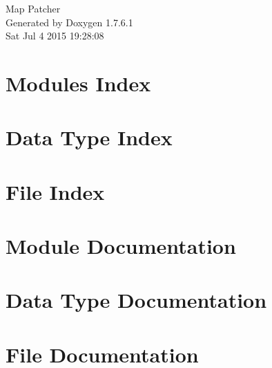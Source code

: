 \documentclass[a4paper]{book}
\begin{document}
\hypersetup{pageanchor=false,citecolor=blue}
\begin{titlepage}
\vspace*{7cm}
\begin{center}
{\Large \-Map \-Patcher }\\
\vspace*{1cm}
{\large \-Generated by Doxygen 1.7.6.1}\\
\vspace*{0.5cm}
{\small Sat Jul 4 2015 19:28:08}\\
\end{center}
\end{titlepage}
\clearemptydoublepage
{}
\tableofcontents
\clearemptydoublepage
{}
\hypersetup{pageanchor=true,citecolor=blue}
\chapter{\-Modules \-Index}

\chapter{\-Data \-Type \-Index}

\chapter{\-File \-Index}

\chapter{\-Module \-Documentation}





\chapter{\-Data \-Type \-Documentation}


\chapter{\-File \-Documentation}





\printindex
\end{document}
